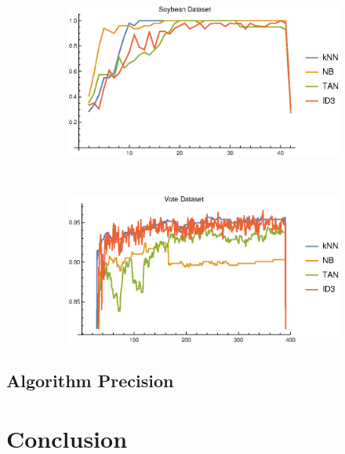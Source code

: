 \documentclass{article}
\begin{document}
\begin{figure}[h]
\begin{subfigure}[b]{0.49\textwidth}
			\end{subfigure} \	
			\begin{subfigure}[b]{0.49\textwidth}
				\centering
				\includegraphics[width=\textwidth]{figs//plot_conv_soybean}					
			\end{subfigure} \	
			\begin{subfigure}[b]{0.49\textwidth}
				\centering
				\includegraphics[width=\textwidth]{figs/plot_conv_vote}					
			\end{subfigure}
			\caption{}
			\label{conv_plot}
		\end{figure}
	\subsection{Algorithm Precision}
\section{Conclusion}
	

	\pagebreak


	
	
	
\end{document}
